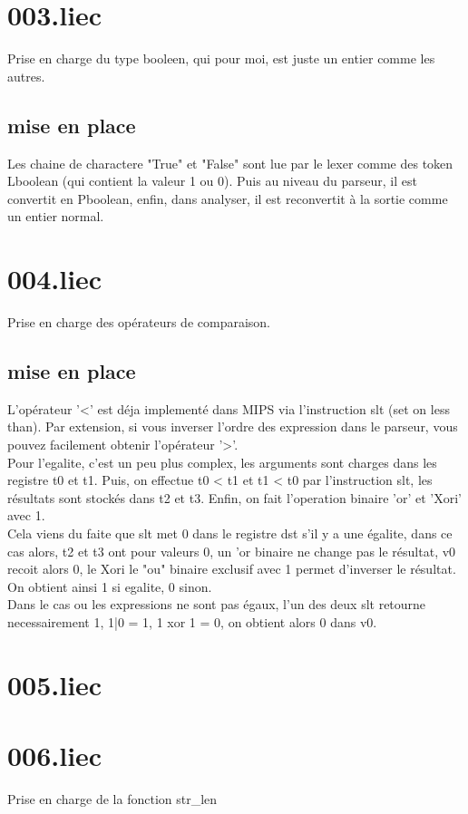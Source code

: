 \documentclass[12pt, letterpaper]{article}
\begin{document}
\section{003.liec}
Prise en charge du type booleen, qui pour moi, est juste un entier comme les autres.
\subsection{mise en place}
Les chaine de charactere "True" et "False" sont lue par le lexer comme des token Lboolean (qui contient la valeur 1 ou 0). 
Puis au niveau du parseur, il est convertit en Pboolean, enfin, dans analyser, il est reconvertit à la sortie comme un entier normal.

\section{004.liec}
Prise en charge des opérateurs de comparaison.
\subsection{mise en place}
L'opérateur '<' est déja implementé dans MIPS via l'instruction slt (set on less than).
Par extension, si vous inverser l'ordre des expression dans le parseur, vous pouvez facilement obtenir 
l'opérateur '>'.\\
Pour l'egalite, c'est un peu plus complex, les arguments sont charges dans les registre t0 et t1. 
Puis, on effectue t0 < t1 et t1 < t0 par l'instruction slt, les résultats sont stockés dans t2 et t3. 
Enfin, on fait l'operation binaire 'or' et 'Xori' avec 1.\\
Cela viens du faite que slt met 0 dans le registre dst s'il y a une égalite, 
dans ce cas alors, t2 et t3 ont pour valeurs 0, un 'or binaire ne change pas le résultat, 
v0 recoit alors 0, le Xori le "ou" binaire exclusif avec 1 permet d'inverser le résultat. 
On obtient ainsi 1 si egalite, 0 sinon.\\
Dans le cas ou les expressions ne sont pas égaux, l'un des deux slt retourne necessairement 1, 
1|0 = 1, 1 xor 1 = 0, on obtient alors 0 dans v0.

\section{005.liec}

\section{006.liec}
Prise en charge de la fonction str\_len
\end{document}
